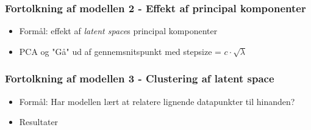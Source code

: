 \documentclass{beamer}
\begin{document}
\begin{frame}
    \frametitle{Fortolkning af modellen 2 - Effekt af principal komponenter}
    \begin{itemize}
        \item<1-> Formål: effekt af \textit{latent space}s principal komponenter
        \item<2-> PCA og "Gå" ud af gennemsnitspunkt med stepsize = $c \cdot \sqrt{\lambda}$
    \end{itemize}
    \begin{minipage}{\textwidth}
    \end{minipage}
\end{frame}

\begin{frame}
    \frametitle{Fortolkning af modellen 3 - Clustering af latent space}
    \begin{itemize}
        \item<1-> Formål: Har modellen lært at relatere lignende datapunkter til hinanden?
        \item<2-> Resultater
    \end{itemize}
\end{frame}
\end{document}
